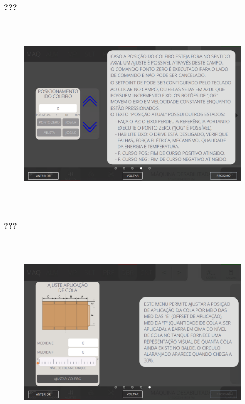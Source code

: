 \newpage
\thispagestyle{fancy}
\vspace*{\fill}
\subsubsection{\small{???}}
\begin{figure}[h]
  \centering
  \includegraphics[width=576px,height=360px]{src/imagesFlexo/07-fold/settings/e-4.png}
   \label{}
\end{figure}
\vspace*{\fill}

\newpage
\thispagestyle{fancy}
\vspace*{\fill}
\subsubsection{\small{???}}
\begin{figure}[h]
  \centering
  \includegraphics[width=576px,height=360px]{src/imagesFlexo/07-fold/settings/e-5.png}
   \label{}
\end{figure}
\vspace*{\fill}

